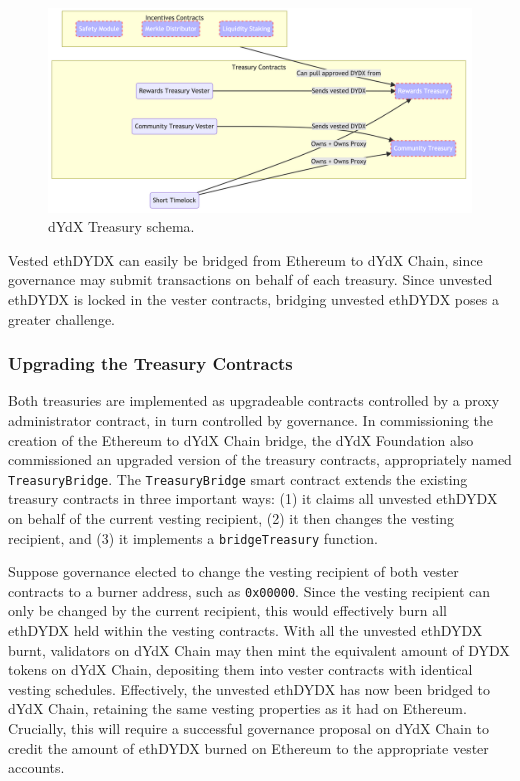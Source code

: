             \begin{figure}[htp]
                \centering
                \includegraphics[width=\linewidth]{figs/schema.png}
                \caption{dYdX Treasury schema.}
                \label{fig:govschema}
            \end{figure}

            Vested ethDYDX can easily be bridged from Ethereum to dYdX Chain, since governance may submit transactions on behalf of each treasury. Since unvested ethDYDX is locked in the vester contracts, bridging unvested ethDYDX poses a greater challenge.

        \subsubsection{Upgrading the Treasury Contracts} \label{subsubsec:upgrade}          
        
            Both treasuries are implemented as upgradeable contracts controlled by a proxy administrator contract, in turn controlled by governance. In commissioning the creation of the Ethereum to dYdX Chain bridge, the dYdX Foundation also commissioned an upgraded version of the treasury contracts, appropriately named \texttt{TreasuryBridge}. The \texttt{TreasuryBridge} smart contract extends the existing treasury contracts in three important ways: (1) it claims all unvested ethDYDX on behalf of the current vesting recipient, (2) it then changes the vesting recipient, and (3) it implements a \texttt{bridgeTreasury} function.

            Suppose governance elected to change the vesting recipient of both vester contracts to a burner address, such as \texttt{0x00000}. Since the vesting recipient can only be changed by the current recipient, this would effectively burn all ethDYDX held within the vesting contracts. With all the unvested ethDYDX burnt, validators on dYdX Chain may then mint the equivalent amount of DYDX tokens on dYdX Chain, depositing them into vester contracts with identical vesting schedules. Effectively, the unvested ethDYDX has now been bridged to dYdX Chain, retaining the same vesting properties as it had on Ethereum. Crucially, this will require a successful governance proposal on dYdX Chain to credit the amount of ethDYDX burned on Ethereum to the appropriate vester accounts.

